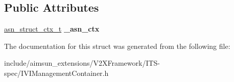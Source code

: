 \subsection*{Public Attributes}
\begin{DoxyCompactItemize}
\item 
\hyperlink{structasn__struct__ctx__s}{asn\+\_\+struct\+\_\+ctx\+\_\+t} {\bfseries \+\_\+asn\+\_\+ctx}\hypertarget{structIVIManagementContainer_1_1IVIManagementContainer____connectedIviStructures_a062d177ade658a917cf9ca4222320c06}{}\label{structIVIManagementContainer_1_1IVIManagementContainer____connectedIviStructures_a062d177ade658a917cf9ca4222320c06}

\end{DoxyCompactItemize}


The documentation for this struct was generated from the following file\+:\begin{DoxyCompactItemize}
\item 
include/aimsun\+\_\+extensions/\+V2\+X\+Framework/\+I\+T\+S-\/spec/I\+V\+I\+Management\+Container.\+h\end{DoxyCompactItemize}
